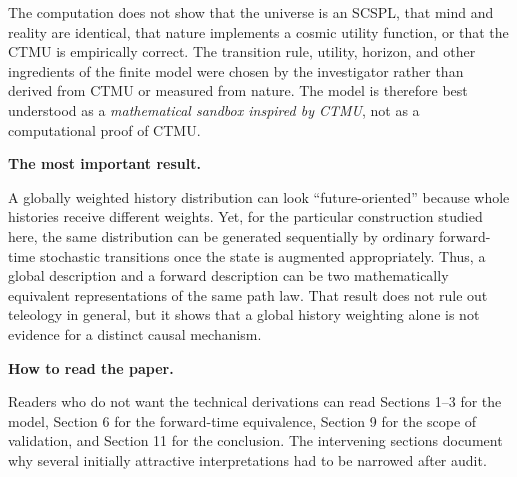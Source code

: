 \documentclass[11pt]{article}
\theoremstyle{remark}
\begin{document}
{\begin{minipage}{0.94\textwidth}
The computation does not show that the universe is an SCSPL, that mind and reality are identical, that nature implements a cosmic utility function, or that the CTMU is empirically correct. The transition rule, utility, horizon, and other ingredients of the finite model were chosen by the investigator rather than derived from CTMU or measured from nature. The model is therefore best understood as a \emph{mathematical sandbox inspired by CTMU}, not as a computational proof of CTMU.

\textbf{The most important result.}

A globally weighted history distribution can look ``future-oriented'' because whole histories receive different weights. Yet, for the particular construction studied here, the same distribution can be generated sequentially by ordinary forward-time stochastic transitions once the state is augmented appropriately. Thus, a global description and a forward description can be two mathematically equivalent representations of the same path law. That result does not rule out teleology in general, but it shows that a global history weighting alone is not evidence for a distinct causal mechanism.

\textbf{How to read the paper.}

Readers who do not want the technical derivations can read Sections 1--3 for the model, Section 6 for the forward-time equivalence, Section 9 for the scope of validation, and Section 11 for the conclusion. The intervening sections document why several initially attractive interpretations had to be narrowed after audit.
\end{minipage}}
\endgroup
\end{document}
